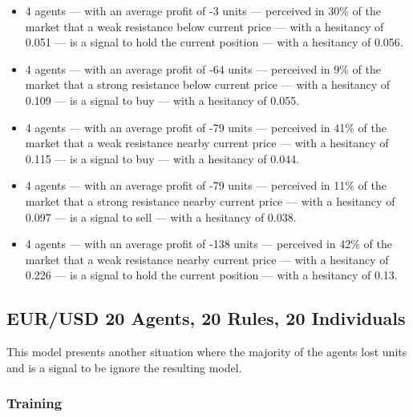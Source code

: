 {\small
  \begin{itemize}
  \item 4 agents — with an average profit of -3 units — perceived in 30\% of the
    market that a weak resistance below current price — with a hesitancy of
    0.051 — is a signal to hold the current position — with a hesitancy of
    0.056.
  \item 4 agents — with an average profit of -64 units — perceived in 9\% of the
    market that a strong resistance below current price — with a hesitancy of
    0.109 — is a signal to buy — with a hesitancy of 0.055.
  \item 4 agents — with an average profit of -79 units — perceived in 41\% of
    the market that a weak resistance nearby current price — with a hesitancy of
    0.115 — is a signal to buy — with a hesitancy of 0.044.
  \item 4 agents — with an average profit of -79 units — perceived in 11\% of
    the market that a strong resistance nearby current price — with a hesitancy
    of 0.097 — is a signal to sell — with a hesitancy of 0.038.
  \item 4 agents — with an average profit of -138 units — perceived in 42\% of
    the market that a weak resistance nearby current price — with a hesitancy of
    0.226 — is a signal to hold the current position — with a hesitancy of 0.13.
  \end{itemize}
}

\subsection{EUR/USD 20 Agents, 20 Rules, 20 Individuals}
\label{}

This model presents another situation where the majority of the agents lost
units and is a signal to be ignore the resulting model.

\subsubsection{Training}
\label{}

